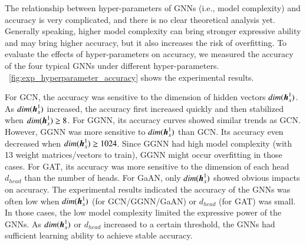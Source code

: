 The relationship between hyper-parameters of GNNs (i.e., model complexity) and accuracy is very complicated, and there is no clear theoretical analysis yet.
%
Generally speaking, higher model complexity can bring stronger expressive ability and may bring higher accuracy, but it also increases the risk of overfitting.
%
To evaluate the effects of hyper-parameters on accuracy, we measured the accuracy of the four typical GNNs under different hyper-parameters.
%
\figurename~\ref{fig:exp_hyperparameter_accuracy} shows the experimental results.

For GCN, the accuracy was sensitive to the dimension of hidden vectors $dim(\boldsymbol{h}^1_x)$.
%
As $dim(\boldsymbol{h}^1_x)$ increased, the accuracy first increased quickly and then stabilized when $dim(\boldsymbol{h}_x^1) \geq 8$.
%
For GGNN, its accuracy curves showed similar trends as GCN.
%
However, GGNN was more sensitive to $dim(\boldsymbol{h}_x^1)$ than GCN.
%
Its accuracy even decreased when $dim(\boldsymbol{h}_x^1) \geq 1024$.
%
Since GGNN had high model complexity (with 13 weight matrices/vectors to train), GGNN might occur overfitting in those cases.
%
For GAT, its accuracy was more sensitive to the dimension of each head $d_{head}$ than the number of heads.
%
For GaAN, only $dim(\boldsymbol{h}_x^1)$ showed obvious impacts on accuracy.
%
The experimental results indicated the accuracy of the GNNs was often low when $dim(\boldsymbol{h}_x^1)$ (for GCN/GGNN/GaAN) or $d_{head}$ (for GAT) was small.
%
In those cases, the low model complexity limited the expressive power of the GNNs.
%
As $dim(\boldsymbol{h}_x^1)$ or $d_{head}$ increased to a certain threshold, the GNNs had sufficient learning ability to achieve stable accuracy.

